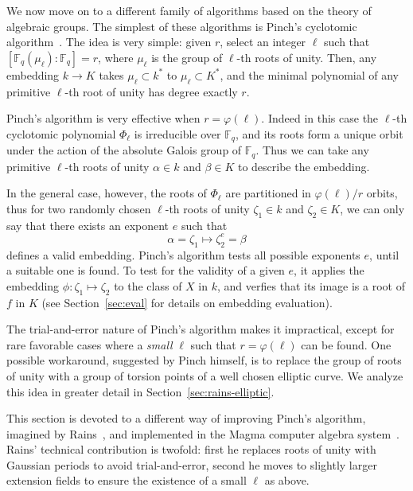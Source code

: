 \documentclass[12pt]{article}
\theoremstyle{plain}
\theoremstyle{definition}
\def\F{\ensuremath{\mathbb{F}}}
\def\euler{\ensuremath{\varphi}}
\newcounter{algorithm}
\begin{document}
We now move on to a different family of algorithms based on the theory of
algebraic groups. The simplest of these algorithms is Pinch's
cyclotomic algorithm~\cite{Pinch}. The idea is very simple: given $r$,
select an integer $\ell$ such that $[\F_q(\mu_\ell):\F_q]=r$, where
$\mu_\ell$ is the group of $\ell$-th roots of unity.  Then, any
embedding $k\to K$ takes $\mu_\ell\subset k^\ast$ to $\mu_\ell\subset
K^\ast$, and the minimal polynomial of any primitive $\ell$-th root of
unity has degree exactly $r$.

Pinch's algorithm is very effective when $r=\euler(\ell)$. Indeed in
this case the $\ell$-th cyclotomic polynomial $\Phi_\ell$ is
irreducible over $\F_q$, and its roots form a unique orbit under the
action of the absolute Galois group of $\F_q$. Thus we can take any
primitive $\ell$-th roots of unity $\alpha\in k$ and $\beta\in K$ to
describe the embedding.

In the general case, however, the roots of $\Phi_\ell$ are partitioned
in $\euler(\ell)/r$ orbits, thus for two randomly chosen $\ell$-th
roots of unity $\zeta_1\in k$ and $\zeta_2\in K$, we can only say that
there exists an exponent $e$ such that
\begin{equation*}
  \alpha = \zeta_1 \mapsto \zeta_2^e = \beta
\end{equation*}
defines a valid embedding. Pinch's algorithm tests all possible
exponents $e$, until a suitable one is found. To test for the validity
of a given $e$, it applies the embedding $\phi:\zeta_1\mapsto\zeta_2$
to the class of $X$ in $k$, and verfies that its image is a root of
$f$ in $K$ (see Section~\ref{sec:eval} for details on embedding
evaluation).

The trial-and-error nature of Pinch's algorithm makes it impractical,
except for rare favorable cases where a \emph{small} $\ell$ such that
$r=\euler(\ell)$ can be found. One possible workaround, suggested by
Pinch himself, is to replace the group of roots of unity with a group
of torsion points of a well chosen elliptic curve. We analyze this
idea in greater detail in Section~\ref{sec:rains-elliptic}.

This section is devoted to a different way of improving Pinch's
algorithm, imagined by Rains~\cite{rains2008}, and implemented in the
Magma computer algebra system~\cite{MAGMA}. Rains' technical
contribution is twofold: first he replaces roots of unity with
Gaussian periods to avoid trial-and-error, second he moves to slightly
larger extension fields to ensure the existence of a small $\ell$ as
above.
\end{document}
